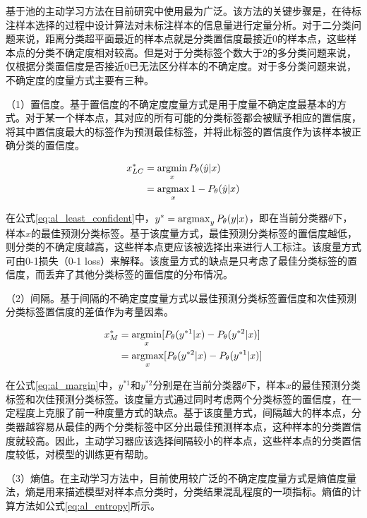 基于池的主动学习方法\cite{muslea2006active}在目前研究中使用最为广泛。该方法的关键步骤是，在待标注样本选择的过程中设计算法对未标注样本的信息量进行定量分析。对于二分类问题来说，距离分类超平面最近的样本点就是分类置信度最接近0的样本点，这些样本点的分类不确定度相对较高。但是对于分类标签个数大于2的多分类问题来说，仅根据分类置信度是否接近0已无法区分样本的不确定度。对于多分类问题来说，不确定度的度量方式主要有三种。

（1）置信度。基于置信度的不确定度度量方式是用于度量不确定度最基本的方式。对于某一个样本点，其对应的所有可能的分类标签都会被赋予相应的置信度，将其中置信度最大的标签作为预测最佳标签，并将此标签的置信度作为该样本被正确分类的置信度。

\begin{align}\label{eq:al_least_confident}
\begin{aligned}
x_{LC}^*&=\operatorname*{argmin}_x P_\theta(\hat{y}|x)\\
&=\operatorname*{argmax}_x 1-P_\theta(\hat{y}|x)
\end{aligned}
\end{align}

在公式\ref{eq:al_least_confident}中，$y^*=\operatorname*{argmax}_y P_\theta (y|x)$，即在当前分类器$\theta$下，样本$x$的最佳预测分类标签。基于该度量方式，最佳预测分类标签的置信度越低，则分类的不确定度越高，这些样本点更应该被选择出来进行人工标注。该度量方式可由0-1损失（0-1 loss）来解释。该度量方式的缺点是只考虑了最佳分类标签的置信度，而丢弃了其他分类标签的置信度的分布情况。

（2）间隔。基于间隔的不确定度度量方式以最佳预测分类标签置信度和次佳预测分类标签置信度的差值作为考量因素。

\begin{align}\label{eq:al_margin}
\begin{aligned}
x_M^*&=\operatorname*{argmin}_x [P_\theta(y^{*1}|x)-P_\theta(y^{*2}|x)]\\
&=\operatorname*{argmax}_x [P_\theta(y^{*2}|x)-P_\theta(y^{*1}|x)]
\end{aligned}
\end{align}

在公式\ref{eq:al_margin}中，$y^{*1}$和$y^{*2}$分别是在当前分类器$\theta$下，样本$x$的最佳预测分类标签和次佳预测分类标签。该度量方式通过同时考虑两个分类标签的置信度，在一定程度上克服了前一种度量方式的缺点。基于该度量方式，间隔越大的样本点，分类器越容易从最佳的两个分类标签中区分出最佳预测样本点，这种样本的分类置信度就较高。因此，主动学习器应该选择间隔较小的样本点，这些样本点的分类置信度较低，对模型的训练更有帮助。

（3）熵值。在主动学习方法中，目前使用较广泛的不确定度度量方式是熵值度量法，熵是用来描述模型对样本点分类时，分类结果混乱程度的一项指标。熵值的计算方法如公式\ref{eq:al_entropy}所示。

